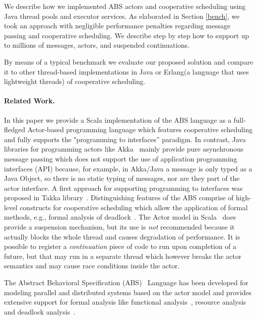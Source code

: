 We describe how we implemented ABS actors and cooperative scheduling using Java thread pools and executor services.  
As elaborated in Section \ref{bench}, we took an approach with negligible performance penalties regarding message passing and cooperative scheduling. 
We describe step by step how to support up to millions of messages, actors, and suspended continuations.


By means of a typical benchmark we evaluate our proposed solution and compare it
to other thread-based implementations in Java or Erlang(a language that uses lightweight threads) of cooperative scheduling.


\paragraph{Related Work.} 
In this paper we provide a Scala implementation of the ABS language as a full-fledged Actor-based programming language which features cooperative scheduling and fully supports the "programming to interfaces'' paradigm. 
In contrast, Java libraries for programming actors like Akka~\cite{Akka} mainly provide pure asynchronous message passing which does not support the use of application programming interfaces (API) because, for example, in Akka/Java a message is only typed as a Java Object, so there is no static typing of messages, nor are they part of the actor interface.  A first approach for supporting programming to interfaces was proposed in Takka library~\cite{takka}. 
Distinguishing features of the ABS comprise of high-level constructs for cooperative scheduling which allow the application of formal methods, e.g.,
formal analysis of deadlock~\cite{deadlock}.
The Actor model in Scala~\cite{Scala} does provide a suspension mechanism, but its use is \emph{not} recommended because it actually blocks the whole thread and causes
degradation of performance.
It is possible to register a {\em continuation} piece of code to run upon completion of a future, but that may run in a separate thread which however breaks the actor semantics and may cause race conditions inside the actor.

The Abstract Behavioral Specification (ABS)~\cite{abs} Language has been developed for modeling parallel and distributed systems based on the actor model and provides extensive support for formal analysis like functional analysis~\cite{KeY}, resource analysis~\cite{saco} and deadlock analysis~\cite{dead}. 


